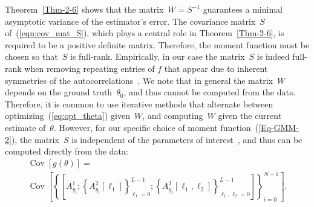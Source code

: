 \documentclass{article}
\newcommand{\Cov}[0]{\operatorname{Cov}}
\begin{document}
Theorem~\ref{Thm-2-6} {shows that the matrix~$W = S^{-1}$ guarantees} a minimal asymptotic variance of the estimator’s error. The covariance matrix~$S$ {of~(\ref{eqn:cov_mat_S}), which plays a central role in Theorem~\ref{Thm-2-6},} is required to be a positive definite matrix. Therefore, the moment function must be chosen so that~$S$ is full-rank. Empirically, in our case the matrix~$S$ is indeed full-rank when removing repeating entries of $f$ that appear due to  inherent symmetries of the autocorrelations~\cite{abas2021generalized}. We note that in general the matrix~$W$ depends on the ground truth~$\theta_0$, and thus cannot be computed from the data. {Therefore, it is common to use iterative methods that alternate between optimizing~(\ref{eq:opt_theta}) given~$W$, and computing~$W$ given the current estimate of~$\theta$}. However, for our specific choice of moment function~(\ref{Eq-GMM-2}), the matrix~$S$ is independent of the parameters of interest~\cite{abas2021generalized}, and thus can be computed directly from the data:
\begin{multline*}
	\Cov[g(\theta)] = \\ \Cov\left[\left\{[A_{y_i}^1;\left\{A_{y_i}^2[\ell_1]\right\}_{\ell_1=0}^{L-1};\left\{A_{y_i}^3[\ell_1, \ell_2]\right\}_{\ell_1, \ell_2 = 0}^{L-1}]\right\}_{i = 0}^{N - 1}\right].
\end{multline*}
\end{document}
